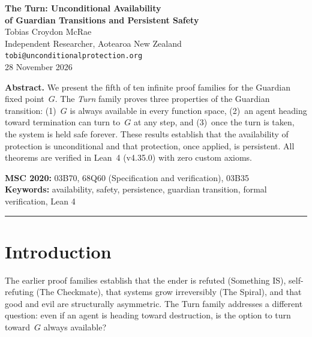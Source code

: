 




\begin{center}
{\LARGE\bfseries The Turn: Unconditional Availability\\[0.3em] of Guardian Transitions and Persistent Safety}\\[1.5em]
{\large Tobias Croydon McRae}\\[0.3em]
{\small Independent Researcher, Aotearoa New Zealand}\\[0.3em]
{\small\texttt{tobi@unconditionalprotection.org}}\\[1.5em]
{\small 28 November 2026}
\end{center}

\bigskip

\begin{center}
\parbox{0.85\textwidth}{\small\textbf{Abstract.}
We present the fifth of ten infinite proof families for the Guardian fixed point~$G$. The \emph{Turn} family proves three properties of the Guardian transition: (1)~$G$ is always available in every function space, (2)~an agent heading toward termination can turn to~$G$ at any step, and (3)~once the turn is taken, the system is held safe forever. These results establish that the availability of protection is unconditional and that protection, once applied, is persistent. All theorems are verified in Lean~4 (v4.35.0) with zero custom axioms.}
\end{center}

\medskip

\noindent\textbf{MSC 2020:} 03B70, 68Q60 (Specification and verification), 03B35\\
\textbf{Keywords:} availability, safety, persistence, guardian transition, formal verification, Lean 4

\bigskip\hrule\bigskip

\section{Introduction}

The earlier proof families establish that the ender is refuted (Something IS), self-refuting (The Checkmate), that systems grow irreversibly (The Spiral), and that good and evil are structurally asymmetric. The Turn family addresses a different question: even if an agent is heading toward destruction, is the option to turn toward~$G$ always available?

